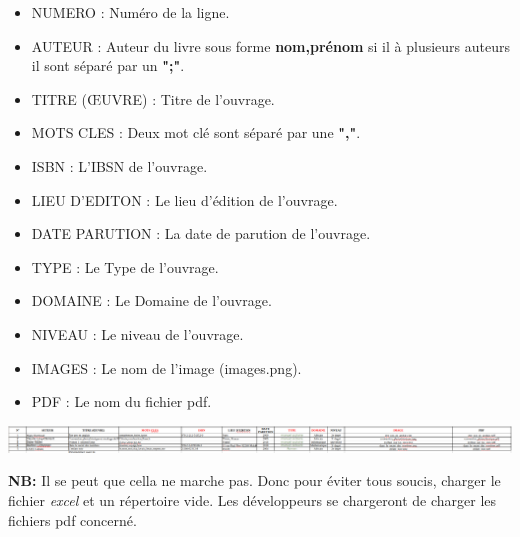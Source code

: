 \documentclass[12pt,a4paper]{article}
\begin{document}
\begin{itemize}
\begin{itemize}
\item NUMERO : Numéro de la ligne.
\item AUTEUR : Auteur du livre sous forme \textbf{nom,prénom} si il à plusieurs auteurs il
sont séparé par un \textbf{";"}.
\item TITRE (ŒUVRE) : Titre de l'ouvrage.
\item MOTS CLES : Deux mot clé sont séparé par une \textbf{","}.
\item ISBN : L'IBSN de l'ouvrage.
\item LIEU D'EDITON : Le lieu d'édition de l'ouvrage.
\item DATE PARUTION : La date de parution de l'ouvrage.
\item TYPE : Le Type de l'ouvrage.
\item DOMAINE : Le Domaine de l'ouvrage.
\item NIVEAU : Le niveau de l'ouvrage.
\item IMAGES : Le nom de l'image (images.png).
\item PDF : Le nom du fichier pdf.
\end{itemize}

\begin{center}
\includegraphics[scale=0.25]{img/fromat_excel_num.png}
\end{center}

\textbf{NB:} Il se peut que cella ne marche pas. Donc pour éviter tous soucis, charger le fichier
\textit{excel} et un répertoire vide. Les développeurs se chargeront de charger les fichiers pdf concerné.

\end{itemize} 

\newpage
\end{document}
